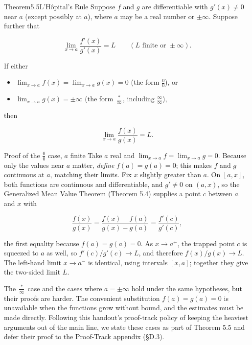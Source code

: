 \documentclass[a4paper,12pt,oneside]{memoir}
\begin{document}
\begin{envtheorem}{Theorem}{5.5}{L’Hôpital’s Rule}
Suppose \(f\) and \(g\) are differentiable with \(g'(x) \ne 0\) near \(a\) (except possibly at \(a\)), where \(a\) may be a real number or \(\pm\infty\). Suppose further that

\[ \lim_{x \to a} \frac{f'(x)}{g'(x)} = L \qquad (L \text{ finite or } \pm\infty). \]

If either

\begin{itemize}
  \item \(\displaystyle \lim_{x \to a} f(x) = \lim_{x \to a} g(x) = 0\) (the form \(\tfrac{0}{0}\)), or
  \item \(\displaystyle \lim_{x \to a} g(x) = \pm\infty\) (the form \(\tfrac{\ast}{\infty}\), including \(\tfrac{\infty}{\infty}\)),
\end{itemize}
then

\[ \lim_{x \to a} \frac{f(x)}{g(x)} = L. \]
\end{envtheorem}
\begin{envproof}{Proof of the \(\tfrac{0}{0}\) case, \(a\) finite}{}{}
Take \(a\) real and \(\lim_{x \to a} f = \lim_{x \to a} g = 0\). Because only the values near \(a\) matter, \emph{define} \(f(a) = g(a) = 0\); this makes \(f\) and \(g\) continuous at \(a\), matching their limits. Fix \(x\) slightly greater than \(a\). On \([a, x]\), both functions are continuous and differentiable, and \(g' \ne 0\) on \((a, x)\), so the Generalized Mean Value Theorem (Theorem 5.4) supplies a point \(c\) between \(a\) and \(x\) with

\[ \frac{f(x)}{g(x)} = \frac{f(x) - f(a)}{g(x) - g(a)} = \frac{f'(c)}{g'(c)}, \]

the first equality because \(f(a) = g(a) = 0\). As \(x \to a^{+}\), the trapped point \(c\) is squeezed to \(a\) as well, so \(f'(c)/g'(c) \to L\), and therefore \(f(x)/g(x) \to L\). The left-hand limit \(x \to a^{-}\) is identical, using intervals \([x, a]\); together they give the two-sided limit \(L\). \qedmark
\end{envproof}
The \(\tfrac{\ast}{\infty}\) case and the cases where \(a = \pm\infty\) hold under the same hypotheses, but their proofs are harder. The convenient substitution \(f(a) = g(a) = 0\) is unavailable when the functions grow without bound, and the estimates must be made directly. Following this handout’s proof-track policy of keeping the heaviest arguments out of the main line, we state these cases as part of Theorem 5.5 and defer their proof to the Proof-Track appendix (§D.3).
\end{document}
